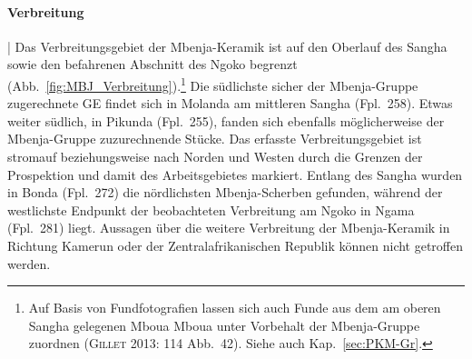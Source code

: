\paragraph{Verbreitung}\hspace{-.5em}|\hspace{.5em}%
Das Verbreitungsgebiet der Mbenja-Keramik ist auf den Oberlauf des \mbox{Sangha} sowie den befahrenen Abschnitt des \mbox{Ngoko} begrenzt (Abb.~\ref{fig:MBJ_Verbreitung}).\footnote{Auf Basis von Fundfotografien lassen sich auch Funde aus dem am oberen \mbox{Sangha} gelegenen Mboua Mboua unter Vorbehalt der Mbenja-Gruppe zuordnen (\textsc{Gillet} 2013: 114 Abb.~42). Siehe auch Kap.~\ref{sec:PKM-Gr}.} Die südlichste sicher der Mbenja-Gruppe zugerechnete GE findet sich in Molanda am mittleren \mbox{Sangha} (Fpl.~258). Etwas weiter südlich, in Pikunda (Fpl.~255), fanden sich ebenfalls möglicherweise der Mbenja-Gruppe zuzurechnende Stücke. Das erfasste Verbreitungsgebiet ist stromauf beziehungsweise nach Norden und Westen durch die Grenzen der Prospektion und damit des Arbeitsgebietes markiert. Entlang des \mbox{Sangha} wurden in Bonda (Fpl.~272) die nördlichsten Mbenja-Scherben gefunden, während der westlichste Endpunkt der beobachteten Verbreitung am \mbox{Ngoko} in Ngama (Fpl.~281) liegt. Aussagen über die weitere Verbreitung der Mbenja-Keramik in Richtung Kamerun oder der Zentralafrikanischen Republik können nicht getroffen werden. 	
